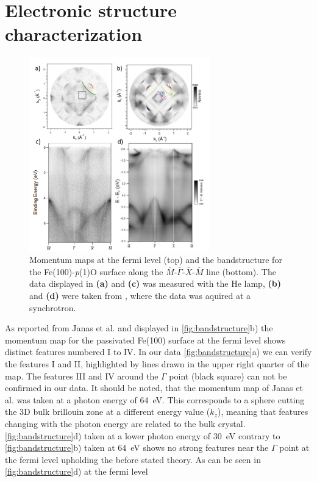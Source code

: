 \newpage
\section{Electronic structure characterization}
\begin{figure}[h]
    \centering
    \includegraphics[width = 0.7\textwidth]{Plots/bandstructure.png}
    \caption{Momentum maps at the fermi level (top) and the bandstructure for the Fe(100)-\textit{p}(1)O surface along the $\overline{M}$-$\overline{\Gamma}$-$\overline{X}$-$\overline{M}$ line (bottom). The data displayed in \textbf{(a)} and \textbf{(c)} was measured with the He lamp, \textbf{(b)} and \textbf{(d)} were taken from \cite*{janas_enhancing_2022}, where the data was aquired at a synchrotron.}
    \label{fig:bandstructure}
\end{figure}
\FloatBarrier
As reported from Janas et al. \cite*{janas_enhancing_2022} and displayed in \autoref{fig:bandstructure}b) the momentum map for the passivated Fe(100) surface at the fermi level shows distinct features numbered I to IV.
In our data \autoref{fig:bandstructure}a) we can verify the features I and II, highlighted by lines drawn in the upper right quarter of the map.
The features III and IV around the $\Gamma$ point (black square) can not be confirmed in our data.
It should be noted, that the momentum map of Janas et al. \cite*{janas_enhancing_2022} was taken at a photon energy of \qty{64}{eV}.
This corresponds to a sphere cutting the 3D bulk brillouin zone at a different energy value ($k_z$), meaning that features changing with the photon energy are related to the bulk crystal.
\autoref{fig:bandstructure}d) taken at a lower photon energy of \qty{30}{eV} contrary to \autoref{fig:bandstructure}b) taken at \qty{64}{eV} shows no strong features near the $\Gamma$ point at the fermi level upholding the before stated theory.
As can be seen in \autoref{fig:bandstructure}d) at the fermi level

